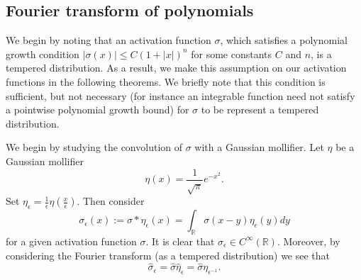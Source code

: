 \subsection{Fourier transform of polynomials}
We begin by noting that an activation
function $\sigma$, which satisfies a polynomial growth condition
$|\sigma(x)| \leq C(1 + |x|)^n$ for some constants $C$ and $n$, is a
tempered distribution. As a result, we make this assumption on our
activation functions in the following theorems. We briefly note that
this condition is sufficient, but not necessary (for instance an
integrable function need not satisfy a pointwise polynomial growth
bound) for $\sigma$ to be represent a tempered distribution.

 We begin by studying the convolution of $\sigma$ with a Gaussian mollifier. Let $\eta$ be a Gaussian mollifier
 \begin{equation}
  \eta(x) = \frac{1}{\sqrt{\pi}}e^{-x^2}.
 \end{equation}
Set $\eta_\epsilon=\frac{1}{\epsilon}\eta(\frac{x}{\epsilon})$. Then consider 
\begin{equation}
\label{sigma-epsilon}
\sigma_{\epsilon}(x):=\sigma\ast{\eta_\epsilon}(x)=\int_{\mathbb{R}}\sigma(x-y){\eta_\epsilon}(y)dy
\end{equation}
for a given activation function $\sigma$.
It is clear that $\sigma_{\epsilon}\in C^\infty(\mathbb{R})$. Moreover, by considering the Fourier transform (as a tempered
distribution) we see that
\begin{equation}\label{eq_278}
 \hat{\sigma}_{\epsilon} = \hat{\sigma}\hat{\eta}_{\epsilon} = \hat{\sigma}\eta_{\epsilon^{-1}}.
\end{equation} 


